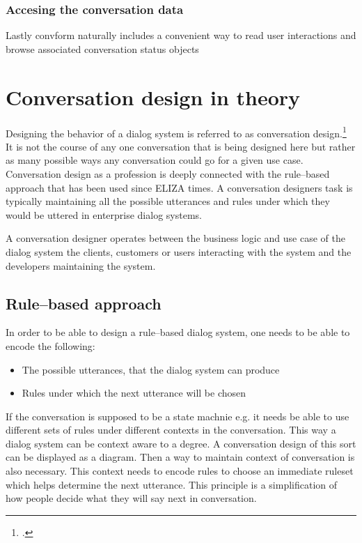 \documentclass[12pt]{report}
\begin{document}
{\subsubsection{Accesing the conversation data}
Lastly convform naturally includes a convenient way to read user interactions
and browse associated conversation status objects

\section{Conversation design in theory}


\par
Designing the behavior of a dialog system
is referred to as conversation design.\footcite{kolosova2022,mctear2020conversational,cxd}
It is not the course of any one conversation that is being designed here
but rather as many possible ways any conversation could go
for a given use case.
Conversation design as a profession is deeply connected
with the rule–based approach that has been used since ELIZA times.
A conversation designers task is typically maintaining all the possible utterances and
rules under which they would be uttered
in enterprise dialog systems.

A conversation designer operates between
the business logic and use case of the dialog system
the clients, customers or users interacting with the system
and the developers maintaining the system.

\subsection{Rule–based approach}

In order to be able to design a rule–based dialog system,
one needs to be able to encode the following:

    \begin{itemize}

        \item
        The possible utterances, that the dialog system can produce

        \item
        Rules under which the next utterance will be chosen
    \end{itemize}

\par
If the conversation is supposed to be a state machnie e.g.
it needs be able to use different sets of rules
under different contexts in the conversation.
This way a dialog system can be context aware to a degree.
A conversation design of this sort
can be displayed as a diagram.
Then a way to maintain context of conversation is also necessary.
This context needs to encode rules to choose an immediate ruleset
which helps determine the next utterance.
This principle is a simplification of
how people decide what they will say next in conversation.

}
\end{document}
